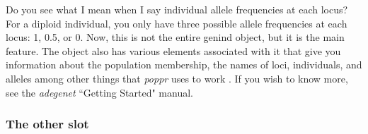 \documentclass[letterpaper]{article}\usepackage[]{graphicx}\usepackage[]{color}
\newcommand{\tab}{\hspace*{1em}}
\begin{document}
Do you see what I mean when I say individual allele frequencies at each locus? For a diploid individual, you only have three possible allele frequencies at each locus: 1, 0.5, or 0. Now, this is not the entire genind object, but it is the main feature. The object also has various elements associated with it that give you information about the population membership, the names of loci, individuals, and alleles among other things that \textit{poppr} uses to work \cite{Jombart:2008}. If you wish to know more, see the \textit{adegenet} ``Getting Started" manual. 

\subsubsection{The other slot}\label{intro:genind:other}

% 
% 
\end{document}
